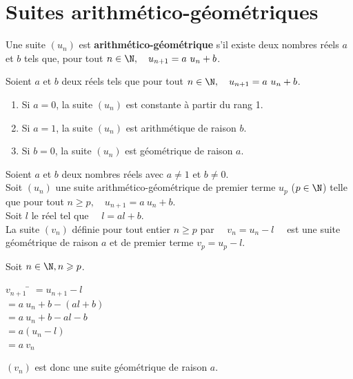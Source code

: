 \documentclass[a4paper,11pt,cours]{nsi} %
\begin{document}
\section{Suites arithmético-géométriques}
\begin{definition}[]
    Une suite $(u_n)$ est \textbf{arithmético-géométrique} s'il existe deux nombres réels $a$ et $b$ tels que, pour tout $n\in \N, \quad u_{n+1}=a\ u_n+b$.
\end{definition}

\begin{remarque}[s]
    Soient $a$ et $b$ deux réels tels que pour tout $n\in\N, \quad u_{n+1}=a\ u_n+b$.
    \begin{enumerate}[label=\textbullet]
        \item Si $a=0$, la suite $(u_n)$ est constante à partir du rang 1.
        \item Si $a=1$, la suite $(u_n)$ est arithmétique de raison $b$.
        \item Si $b=0$, la suite $(u_n)$ est géométrique de raison $a$.
    \end{enumerate}
\end{remarque}

\begin{propriete}
    Soient $a$ et $b$ deux nombres réels avec $a\neq 1$ et $b\neq 0$.\\
    Soit $(u_n)$ une suite arithmético-géométrique de premier terme $u_p$ ($p\in\N$) telle que pour tout $n\geqslant p, \quad u_{n+1}=a\ u_n+b$.\\
    Soit $l$ le réel tel que $\quad l=al+b$.\\

    La suite $(v_n)$ définie pour tout entier $n\geqslant p$ par $\quad v_n=u_n-l\quad$ est une suite géométrique de raison $a$ et de premier terme $v_p=u_p-l$.
\end{propriete}

\begin{demonstration}
    Soit $n\in\N, n\geqslant p$.
    \begin{tabbing}
        $v_{n+1}$   \= $=u_{n+1}-l$\\
            \>  $= a\ u_n+b -(al+b)$\\
            \>  $= a\ u_n +b -al -b$\\
            \>  $= a(u_n-l)$\\
            \>  $= a\ v_n$
    \end{tabbing}
    $(v_n)$ est donc une suite géométrique de raison $a$.
\end{demonstration}
\end{document}

